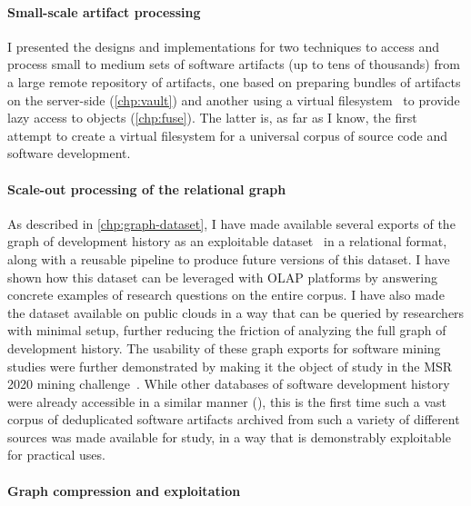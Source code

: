 \paragraph*{Small-scale artifact processing}

I presented the designs and implementations for two techniques to access and
process small to medium sets of software artifacts (up to tens of
thousands) from a large remote repository of artifacts, one based on preparing
bundles of artifacts on the server-side (\cref{chp:vault}) and another using a
virtual filesystem~\cite{swh-2021-swhfs} to provide lazy access to objects
(\cref{chp:fuse}). The latter is, as far as I know, the first attempt to create
a virtual filesystem for a universal corpus of source code and software
development.

\paragraph*{Scale-out processing of the relational graph}

As described in \cref{chp:graph-dataset}, I have made available several exports
of the graph of development history as an exploitable
dataset~\cite{swh-msr2019-dataset} in a relational format, along with a
reusable pipeline to produce future versions of this dataset. I have shown how
this dataset can be leveraged with \gls{OLAP} platforms by answering concrete
examples of research questions on the entire corpus. I have also made the
dataset available on public clouds in a way that can be queried by researchers
with minimal setup, further reducing the friction of analyzing the full graph
of development history. The usability of these graph exports for software
mining studies were further demonstrated by making it the object of study in
the MSR 2020 mining challenge~\cite{msr-2020-challenge}.  While other databases
of software development history were already accessible in a similar manner
(\cite{GHTorrent,web:github-activity-data,mockus2019woc}), this is the first
time such a vast corpus of deduplicated software artifacts archived from such a
variety of different sources was made available for study, in a way that is
demonstrably exploitable for practical uses.

\paragraph*{Graph compression and exploitation}

